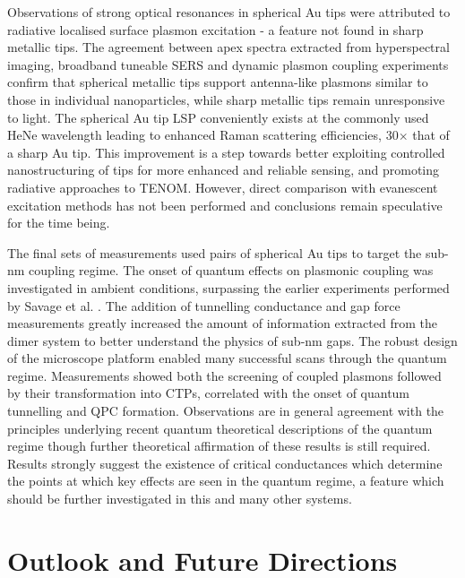 \documentclass[12pt, a4paper, oneside]{book}
\begin{document}
Observations of strong optical resonances in spherical Au tips were attributed to radiative localised surface plasmon excitation - a feature not found in sharp metallic tips. The agreement between apex spectra extracted from hyperspectral imaging, broadband tuneable SERS and dynamic plasmon coupling experiments confirm that spherical metallic tips support antenna-like plasmons similar to those in individual nanoparticles, while sharp metallic tips remain unresponsive to light. The spherical Au tip LSP conveniently exists at the commonly used HeNe wavelength leading to enhanced Raman scattering efficiencies, 30$\times$ that of a sharp Au tip. This improvement is a step towards better exploiting controlled nanostructuring of tips for more enhanced and reliable sensing, and promoting radiative approaches to TENOM. However, direct comparison with evanescent excitation methods has not been performed and conclusions remain speculative for the time being.

The final sets of measurements used pairs of spherical Au tips to target the sub-nm coupling regime. The onset of quantum effects on plasmonic coupling was investigated in ambient conditions, surpassing the earlier experiments performed by Savage et al. \cite{savage2012}. The addition of tunnelling conductance and gap force measurements greatly increased the amount of information extracted from the dimer system to better understand the physics of sub-nm gaps. The robust design of the microscope platform enabled many successful scans through the quantum regime. Measurements showed both the screening of coupled plasmons followed by their transformation into CTPs, correlated with the onset of quantum tunnelling and QPC formation. Observations are in general agreement with the principles underlying recent quantum theoretical descriptions of the quantum regime though further theoretical affirmation of these results is still required. Results strongly suggest the existence of critical conductances which determine the points at which key effects are seen in the quantum regime, a feature which should be further investigated in this and many other systems.

\section{Outlook and Future Directions}
\end{document}
